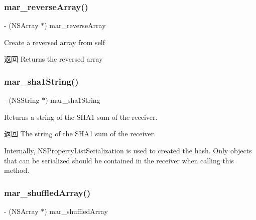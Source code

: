 \subsubsection{\texorpdfstring{mar\+\_\+reverse\+Array()}{mar\_reverseArray()}}
{\footnotesize\ttfamily -\/ (N\+S\+Array $\ast$) mar\+\_\+reverse\+Array \begin{DoxyParamCaption}{ }\end{DoxyParamCaption}}

Create a reversed array from self

\begin{DoxyReturn}{返回}
Returns the reversed array 
\end{DoxyReturn}
\mbox{\label{category_n_s_array_07_m_a_r_e_x_08_a9e145349ba83bc7ba5630b34c5045987}} 
\subsubsection{\texorpdfstring{mar\+\_\+sha1\+String()}{mar\_sha1String()}}
{\footnotesize\ttfamily -\/ (N\+S\+String $\ast$) mar\+\_\+sha1\+String \begin{DoxyParamCaption}{ }\end{DoxyParamCaption}}

Returns a string of the S\+H\+A1 sum of the receiver.

\begin{DoxyReturn}{返回}
The string of the S\+H\+A1 sum of the receiver.
\end{DoxyReturn}
Internally, {\ttfamily N\+S\+Property\+List\+Serialization} is used to created the hash. Only objects that can be serialized should be contained in the receiver when calling this method. \mbox{\label{category_n_s_array_07_m_a_r_e_x_08_af3e9feb3638dd6deaf32cb560fc4207f}} 
\subsubsection{\texorpdfstring{mar\+\_\+shuffled\+Array()}{mar\_shuffledArray()}}
{\footnotesize\ttfamily -\/ (N\+S\+Array $\ast$) mar\+\_\+shuffled\+Array \begin{DoxyParamCaption}{ }\end{DoxyParamCaption}}

